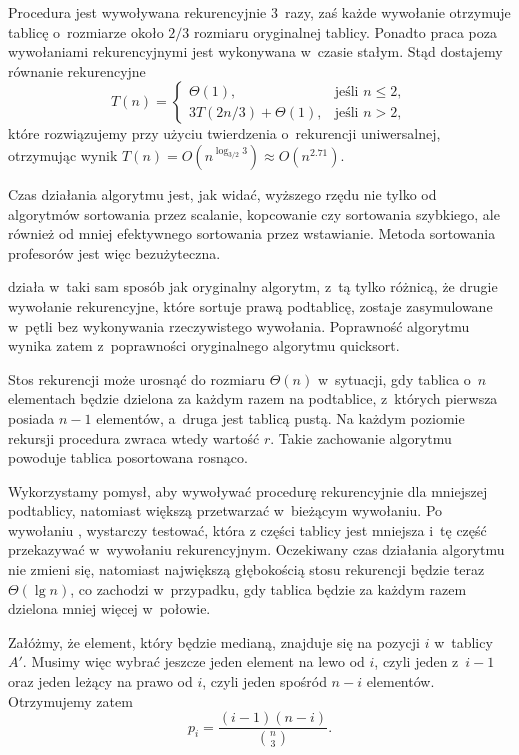 \subproblem %
Procedura jest wywoływana rekurencyjnie 3~razy, zaś każde wywołanie otrzymuje tablicę o~rozmiarze około $2/3$ rozmiaru oryginalnej tablicy. Ponadto praca poza wywołaniami rekurencyjnymi jest wykonywana w~czasie stałym. Stąd dostajemy równanie rekurencyjne
\[
	T(n) =
	\begin{cases}
		\Theta(1), & \text{jeśli $n\le2$}, \\
		3T(2n/3)+\Theta(1), & \text{jeśli $n>2$},
	\end{cases}
\]
które rozwiązujemy przy użyciu twierdzenia o~rekurencji uniwersalnej, otrzymując wynik $T(n)=O(n^{\log_{3/2}3})\approx O(n^{2{.}71})$.

\subproblem %
Czas działania algorytmu  jest, jak widać, wyższego rzędu nie tylko od algorytmów sortowania przez scalanie, kopcowanie czy sortowania szybkiego, ale również od mniej efektywnego sortowania przez wstawianie. Metoda sortowania profesorów jest więc bezużyteczna.


\subproblem %
 działa w~taki sam sposób jak oryginalny algorytm, z~tą tylko różnicą, że drugie wywołanie rekurencyjne, które sortuje prawą podtablicę, zostaje zasymulowane w~pętli bez wykonywania rzeczywistego wywołania. Poprawność algorytmu wynika zatem z~poprawności oryginalnego algorytmu quicksort.

\subproblem %
Stos rekurencji może urosnąć do rozmiaru $\Theta(n)$ w~sytuacji, gdy tablica o~$n$ elementach będzie dzielona za każdym razem na podtablice, z~których pierwsza posiada $n-1$ elementów, a~druga jest tablicą pustą. Na każdym poziomie rekursji procedura  zwraca wtedy wartość $r$. Takie zachowanie algorytmu powoduje tablica posortowana rosnąco.

\subproblem %
Wykorzystamy pomysł, aby wywoływać procedurę rekurencyjnie dla mniejszej podtablicy, natomiast większą przetwarzać w~bieżącym wywołaniu. Po wywołaniu , wystarczy testować, która z części tablicy jest mniejsza i~tę część przekazywać w~wywołaniu rekurencyjnym. Oczekiwany czas działania algorytmu nie zmieni się, natomiast największą głębokością stosu rekurencji będzie teraz $\Theta(\lg n)$, co zachodzi w~przypadku, gdy tablica będzie za każdym razem dzielona mniej więcej w~połowie.


\subproblem %
Załóżmy, że element, który będzie medianą, znajduje się na pozycji $i$ w~tablicy $A'$. Musimy więc wybrać jeszcze jeden element na lewo od $i$, czyli jeden z~$i-1$ oraz jeden leżący na prawo od $i$, czyli jeden spośród $n-i$ elementów. Otrzymujemy zatem
\[
	p_i = \frac{(i-1)(n-i)}{\binom{n}{3}}.
\]

